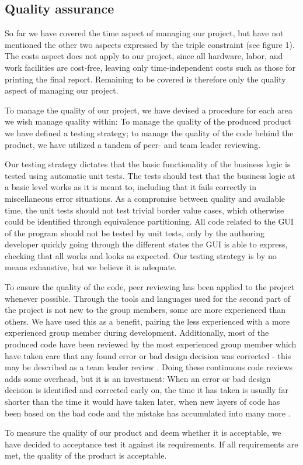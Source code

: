 \subsection{Quality assurance}

So far we have covered the time aspect of managing our project, but have not mentioned the other two aspects expressed by the triple constraint (see figure 1).
The costs aspect does not apply to our project, since all hardware, labor, and work facilities are cost-free, leaving only time-independent costs such as those for printing the final report.
Remaining to be covered is therefore only the quality aspect of managing our project.

To manage the quality of our project, we have devised a procedure for each area we wish manage quality within: To manage the quality of the produced product we have defined a testing strategy; to manage the quality of the code behind the product, we have utilized a tandem of peer- and team leader reviewing.

Our testing strategy dictates that the basic functionality of the business logic is tested using automatic unit tests. The tests should test that the business logic at a basic level works as it is meant to, including that it fails correctly in miscellaneous error situations.
As a compromise between quality and available time, the unit tests should not test trivial border value cases, which otherwise could be identified through equivalence partitioning.
All code related to the GUI of the program should not be tested by unit tests, only by the authoring developer quickly going through the different states the GUI is able to express, checking that all works and looks as expected.
Our testing strategy is by no means exhaustive, but we believe it is adequate.

To ensure the quality of the code, peer reviewing has been applied to the project whenever possible. Through the tools and languages used for the second part of the project is not new to the group members, some are more experienced than others.
We have used this as a benefit, pairing the less experienced with a more experienced group member during development. Additionally, most of the produced code have been reviewed by the most experienced group member which have taken care that any found error or bad design decision was corrected - this may be described as a team leader review \cite[p. 199]{PM}.
Doing these continuous code reviews adds some overhead, but it is an investment: When an error or bad design decision is identified and corrected early on, the time it has taken is usually far shorter than the time it would have taken later, when new layers of code has been based on the bad code and the mistake has accumulated into many more \cite[p. 247]{PM}.

To measure the quality of our product and deem whether it is acceptable, we have decided to acceptance test it against its requirements. If all requirements are met, the quality of the product is acceptable.
